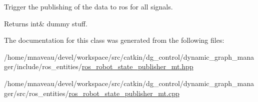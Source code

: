 Trigger the publishing of the data to ros for all signals. 

\begin{DoxyReturn}{Returns}
int\& dummy stuff. 
\end{DoxyReturn}


The documentation for this class was generated from the following files\+:\begin{DoxyCompactItemize}
\item 
/home/mnaveau/devel/workspace/src/catkin/dg\+\_\+control/dynamic\+\_\+graph\+\_\+manager/include/ros\+\_\+entities/\hyperlink{ros__robot__state__publisher__mt_8hpp}{ros\+\_\+robot\+\_\+state\+\_\+publisher\+\_\+mt.\+hpp}\item 
/home/mnaveau/devel/workspace/src/catkin/dg\+\_\+control/dynamic\+\_\+graph\+\_\+manager/src/ros\+\_\+entities/\hyperlink{ros__robot__state__publisher__mt_8cpp}{ros\+\_\+robot\+\_\+state\+\_\+publisher\+\_\+mt.\+cpp}\end{DoxyCompactItemize}
